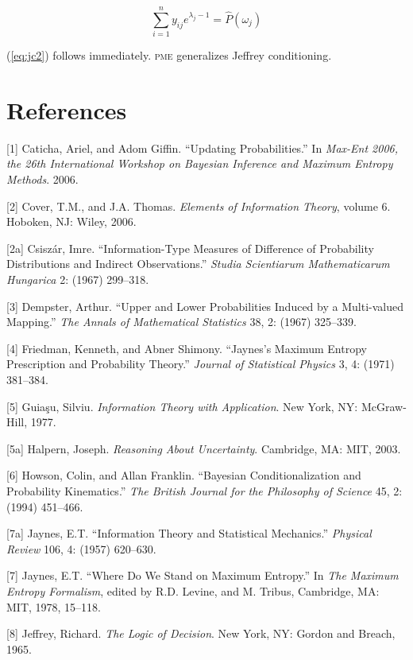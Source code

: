 \documentclass[entropy,article,submit,oneauthor,pdftex,12pt,a4paper]{mdpi}
\begin{document}
\begin{equation}
  \label{eq:jc5}
  \sum_{i=1}^{n}y_{ij}e^{\lambda_{j}-1}=\hat{P}(\omega_{j})
\end{equation}

{\noindent}(\ref{eq:jc2}) follows immediately. \textsc{pme}
generalizes Jeffrey conditioning.

\section{References}
\label{References}

[1] Caticha, Ariel, and Adom Giffin. ``Updating Probabilities.'' In \emph{Max-Ent 2006, the 26th International Workshop on Bayesian Inference and Maximum Entropy Methods}. 2006.

[2] Cover, T.M., and J.A. Thomas. \emph{Elements of Information Theory}, volume 6. Hoboken, NJ: Wiley, 2006.

[2a] Csisz{\'a}r, Imre. ``Information-Type Measures of Difference of Probability Distributions and Indirect Observations.'' \emph{Studia Scientiarum Mathematicarum Hungarica} 2: (1967) 299--318.

[3] Dempster, Arthur. ``Upper and Lower Probabilities Induced by a Multi-valued Mapping.'' \emph{The Annals of Mathematical Statistics} 38, 2: (1967) 325--339.

[4] Friedman, Kenneth, and Abner Shimony. ``Jaynes's Maximum Entropy Prescription and Probability Theory.'' \emph{Journal of Statistical Physics} 3, 4: (1971) 381--384.

[5] Guia{\c{s}}u, Silviu. \emph{Information Theory with Application}. New York, NY: McGraw-Hill, 1977. 

[5a] Halpern, Joseph. \emph{Reasoning About Uncertainty}. Cambridge, MA: MIT, 2003.

[6] Howson, Colin, and Allan Franklin. ``Bayesian Conditionalization and Probability Kinematics.'' \emph{The British Journal for the Philosophy of Science} 45, 2: (1994) 451--466.

[7a] Jaynes, E.T. ``Information Theory and Statistical Mechanics.'' \emph{Physical Review} 106, 4: (1957) 620--630.

[7] Jaynes, E.T. ``Where Do We Stand on Maximum Entropy.'' In \emph{The Maximum Entropy Formalism}, edited by R.D. Levine, and M. Tribus, Cambridge, MA: MIT, 1978, 15--118.

[8] Jeffrey, Richard. \emph{The Logic of Decision}. New York, NY: Gordon and Breach, 1965.
\end{document}
